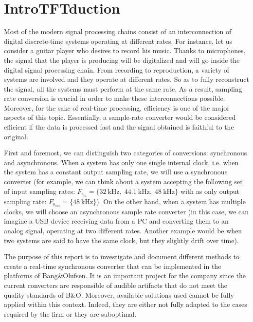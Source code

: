 

\chapter{IntroTFTduction} \label{gen_intro}%

\label{Chapter1} %

Most of the modern signal processing chains consist of an interconnection of digital discrete-time systems operating at different rates. For instance, let us consider a guitar player who desires to record his music. Thanks to microphones, the signal that the player is producing will be digitalized and will go inside the digital signal processing chain. From recording to reproduction, a variety of systems are involved and they operate at different rates. So as to fully reconstruct the signal, all the systems must perform at the same rate. As a result, sampling rate conversion is crucial in order to make these interconnections possible. Moreover, for the sake of real-time processing, efficiency is one of the major aspects of this topic. Essentially, a sample-rate converter would be considered efficient if the data is processed fast and the signal obtained is faithful to the original.


 
First and foremost, we can distinguish two categories of conversions: synchronous and asynchronous. When a system has only one single internal clock, i.e. when the system has a constant output sampling rate, we will use a synchronous converter (for example, we can think about a system accepting the following set of input sampling rates: $ F_\mathrm{s_{in}} = \{\SI{32}{\kilo \Hz}, \;  \SI{44.1}{\kilo \Hz}, \; \SI{48}{\kilo \Hz}  \}  $ with as only output sampling rate: $ F_\mathrm{s_{out}} = \{\SI{48}{\kilo \Hz} \}$). On the other hand, when a system has multiple clocks, we will choose an asynchronous sample rate converter (in this case, we can imagine a USB device receiving data from a PC and converting them to an analog signal, operating at two different rates. Another example would be when two systems are said to have the same clock, but they slightly drift over time). 


The purpose of this report is to investigate and document different methods to create a real-time synchronous converter that can be implemented in the platforms of Bang\&Olufsen. It is an important project for the company since the current converters are responsible of audible artifacts that do not meet the quality standards of B\&O. Moreover, available solutions used cannot be fully applied within this context. Indeed, they are either not fully adapted to the cases required by the firm or they are suboptimal. 


